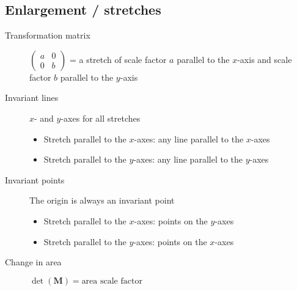 \subsection{Enlargement / stretches}
\begin{description}
	\item[Transformation matrix] $\begin{pmatrix}
		a & 0 \\ 0 & b
	\end{pmatrix}$ = a stretch of scale factor $a$ parallel to the $x$-axis and scale factor $b$ parallel to the $y$-axis
	\item[Invariant lines] $x$- and $y$-axes for all stretches
	\begin{itemize}
		\item Stretch parallel to the $x$-axes: any line parallel to the $x$-axes
		\item Stretch parallel to the $y$-axes: any line parallel to the $y$-axes
	\end{itemize}
	\item[Invariant points] The origin is always an invariant point
	\begin{itemize}
		\item Stretch parallel to the $x$-axes: points on the $y$-axes
		\item Stretch parallel to the $y$-axes: points on the $x$-axes
	\end{itemize}
	\item[Change in area] $\det(\mathbf{M}) = \text{area scale factor}$
\end{description}

